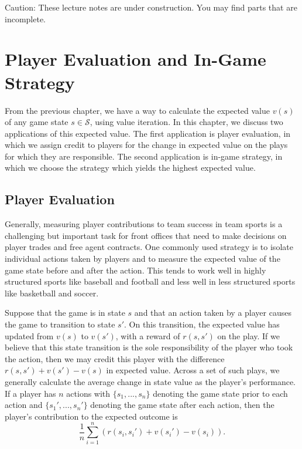 \documentclass{article}
\begin{document}
  \begin{framed}
    {\sc Caution:} These lecture notes are under construction. You may find parts that are incomplete.
  \end{framed}

  \setcounter{section}{6}
  \section{\sc Player Evaluation and In-Game Strategy}

    From the previous chapter, we have a way to calculate the expected value $v(s)$ of any game state $s \in \mathcal S$, using value iteration. In this chapter, we discuss two applications of this expected value. The first application is player evaluation, in which we assign credit to players for the change in expected value on the plays for which they are responsible. The second application is in-game strategy, in which we choose the strategy which yields the highest expected value.

    \subsection{\sc Player Evaluation}

      Generally, measuring player contributions to team success in team sports is a challenging but important task for front offices that need to make decisions on player trades and free agent contracts. One commonly used strategy is to isolate individual actions taken by players and to measure the expected value of the game state before and after the action. This tends to work well in highly structured sports like baseball and football and less well in less structured sports like basketball and soccer.

      Suppose that the game is in state $s$ and that an action taken by a player causes the game to transition to state $s'$. On this transition, the expected value has updated from $v(s)$ to $v(s')$, with a reward of $r(s, s')$ on the play. If we believe that this state transition is the sole responsibility of the player who took the action, then we may credit this player with the difference $r(s, s') + v(s') - v(s)$ in expected value. Across a set of such plays, we generally calculate the average change in state value as the player's performance. If a player has $n$ actions with $\{s_1, ..., s_n\}$ denoting the game state prior to each action and $\{s_1', ..., s_n'\}$ denoting the game state after each action, then the player's contribution to the expected outcome is
      $$
        \frac1n \sum_{i = 1}^n(r(s_i, s_i') + v(s_i') - v(s_i)).
      $$
\end{document}
